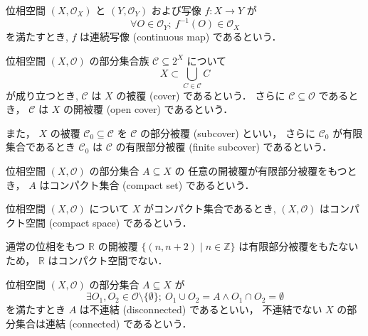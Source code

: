 \documentclass[titlepage]{ltjsreport}
\begin{document}
\begin{definition}[連続写像]\label{def:continuous-map}
  位相空間 $(X,\mathcal{O}_X)$ と $(Y,\mathcal{O}_Y)$ および写像 $f:X\to Y$ が
  \begin{equation}
    \forall O\in\mathcal{O}_Y;\ f^{-1}(O)\in\mathcal{O}_X
  \end{equation}
  を満たすとき,
  $f$ は連続写像 (continuous map) であるという．
\end{definition}

\begin{definition}
  位相空間 $(X,\mathcal{O})$ の部分集合族 $\mathcal{C}\subseteq2^X$ について
  \begin{equation}
    X\subset\bigcup_{C\in\mathcal{C}}C
  \end{equation}
  が成り立つとき,
  $\mathcal{C}$ は $X$ の被覆 (cover) であるという．
  さらに $\mathcal{C}\subseteq\mathcal{O}$ であるとき，
  $\mathcal{C}$ は $X$ の開被覆 (open cover) であるという．

  また，
  $X$ の被覆 $\mathcal{C}_0\subseteq\mathcal{C}$ を
  $\mathcal{C}$ の部分被覆 (subcover) といい，
  さらに $\mathcal{C}_0$ が有限集合であるとき
  $\mathcal{C}_0$ は $\mathcal{C}$ の有限部分被覆 (finite subcover) であるという．
\end{definition}

\begin{definition}[コンパクト集合]
  位相空間 $(X,\mathcal{O})$ の部分集合 $A\subseteq X$ の
  任意の開被覆が有限部分被覆をもつとき，
  $A$ はコンパクト集合 (compact set) であるという．
\end{definition}

\begin{definition}[コンパクト空間]
  位相空間 $(X,\mathcal{O})$ について $X$ がコンパクト集合であるとき,
  $(X,\mathcal{O})$ はコンパクト空間 (compact space) であるという．
\end{definition}

\begin{example}
  通常の位相をもつ
  $\mathbb{R}$
  の開被覆
  $\{(n,n+2)\mid n\in\mathbb{Z}\}$
  は有限部分被覆をもたないため，
  $\mathbb{R}$
  はコンパクト空間でない．
\end{example}

\begin{definition}[連結，不連結]
  位相空間 $(X,\mathcal{O})$ の部分集合 $A\subseteq X$ が
  \begin{equation}
    \exists O_1,O_2\in\mathcal{O}\setminus\{\emptyset\};
    \ O_1\cup O_2=A\wedge O_1\cap O_2=\emptyset
  \end{equation}
  を満たすとき $A$ は不連結 (disconnected) であるといい，
  不連結でない $X$ の部分集合は連結 (connected) であるという．
\end{definition}
\end{document}

